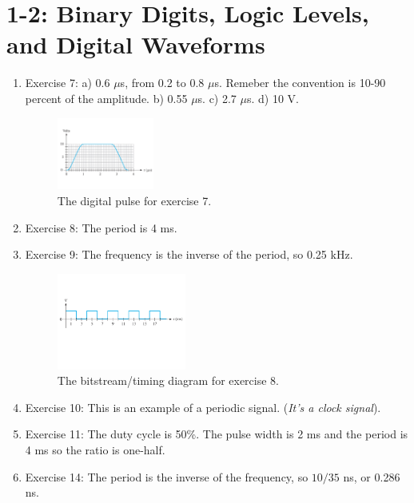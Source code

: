 \documentclass[10pt]{article}
\begin{document}
\maketitle

\section{1-2: Binary Digits, Logic Levels, and Digital Waveforms}

\begin{enumerate}
\item Exercise 7: a) 0.6 $\mu$s, from 0.2 to 0.8 $\mu$s.  Remeber the convention is 10-90 percent of the amplitude. b) 0.55 $\mu$s.  c) 2.7 $\mu$s.  d) 10 V.
\begin{figure}[ht]
\centering
\includegraphics[width=0.3\textwidth,trim=0cm 2cm 0cm 2cm,clip=true]{logicPulse1.pdf}
\caption{\label{fig:logicPulse1} The digital pulse for exercise 7.}
\end{figure}
\item Exercise 8: The period is 4 ms.
\item Exercise 9: The frequency is the inverse of the period, so 0.25 kHz.
\begin{figure}[ht]
\centering
\includegraphics[width=0.4\textwidth,trim=0cm 6cm 0cm 6cm,clip=true]{logicPulse2.pdf}
\caption{\label{fig:logicPulse2} The bitstream/timing diagram for exercise 8.}
\end{figure}
\item Exercise 10: This is an example of a periodic signal.  (\textit{It's a clock signal}).
\item Exercise 11: The duty cycle is 50\%.  The pulse width is 2 ms and the period is 4 ms so the ratio is one-half.
\item Exercise 14: The period is the inverse of the frequency, so $10/35$ ns, or 0.286 ns.
\end{enumerate}
\end{document}
